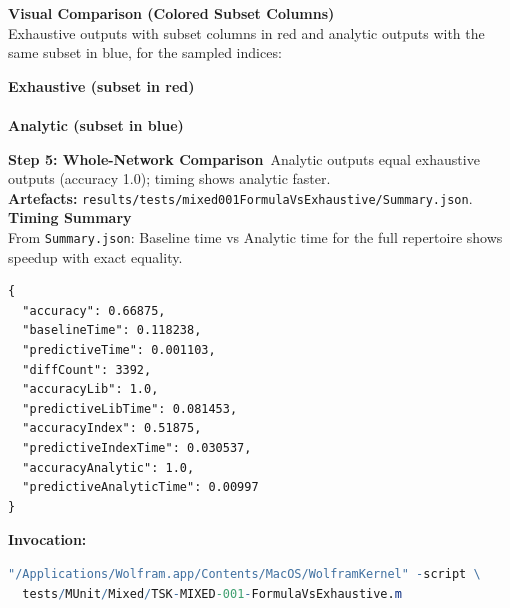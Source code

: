 \documentclass[11pt]{article}
\begin{document}
\textbf{Visual Comparison (Colored Subset Columns)}\\ Exhaustive outputs with subset columns in red and analytic outputs with the same subset in blue, for the sampled indices:\\
\begin{center}
\textbf{Exhaustive (subset in red)}\\

\\[0.5em]
\textbf{Analytic (subset in blue)}\\

\end{center}
\textbf{Step 5: Whole-Network Comparison}\
Analytic outputs equal exhaustive outputs (accuracy 1.0); timing shows analytic faster.\\
\textbf{Artefacts:} \texttt{results/tests/mixed001FormulaVsExhaustive/Summary.json}.\\
\textbf{Timing Summary}\\ From \texttt{Summary.json}: Baseline time vs Analytic time for the full repertoire shows speedup with exact equality.
\begin{lstlisting}[language={}]
{
  "accuracy": 0.66875,
  "baselineTime": 0.118238,
  "predictiveTime": 0.001103,
  "diffCount": 3392,
  "accuracyLib": 1.0,
  "predictiveLibTime": 0.081453,
  "accuracyIndex": 0.51875,
  "predictiveIndexTime": 0.030537,
  "accuracyAnalytic": 1.0,
  "predictiveAnalyticTime": 0.00997
}
\end{lstlisting}
\textbf{Invocation:}
\begin{lstlisting}[language=Mathematica]
"/Applications/Wolfram.app/Contents/MacOS/WolframKernel" -script \
  tests/MUnit/Mixed/TSK-MIXED-001-FormulaVsExhaustive.m
\end{lstlisting}
\end{document}
